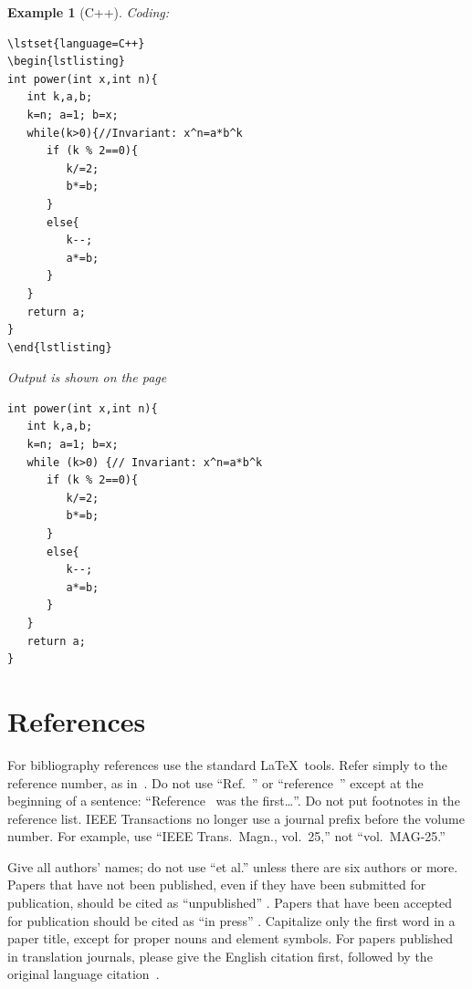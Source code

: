 \documentclass[conference]{IEEEtran}
\newtheorem{example}[remark]{Example}
\begin{document}
\begin{example}[C++]
Coding:
\begin{verbatim}
\lstset{language=C++}
\begin{lstlisting}
int power(int x,int n){
   int k,a,b;
   k=n; a=1; b=x;
   while(k>0){//Invariant: x^n=a*b^k
      if (k % 2==0){
         k/=2;
         b*=b;
      }
      else{
         k--;
         a*=b;
      }
   }
   return a;
}
\end{lstlisting}
\end{verbatim}
Output is shown on the page~\pageref{c++}
\begin{algorithm}[tbp]
\caption{Calculating $x$ to the 
power~$n$ in C++\label{c++}}
\lstset{language=C++}
\begin{lstlisting}
int power(int x,int n){
   int k,a,b;
   k=n; a=1; b=x;
   while (k>0) {// Invariant: x^n=a*b^k
      if (k % 2==0){
         k/=2;
         b*=b;
      }
      else{
         k--;
         a*=b;
      }
   }
   return a;
}
\end{lstlisting}
\end{algorithm}
\end{example}



\section{References}
For bibliography references use the standard \LaTeX\ tools. Refer simply to the reference number, as in~\cite{c3}. Do not use ``Ref.~\cite{c3}'' or ``reference~\cite{c3}'' except at the beginning of a sentence:  ``Reference~\cite{c3} was the first\dots''. Do not put footnotes in the reference list. IEEE Transactions no longer use a journal prefix before the volume number.  For example, use ``IEEE Trans.\ Magn., vol.~25,'' not ``vol.~MAG-25.''

Give all authors' names; do not use ``et al.'' unless there are six authors or more.  Papers that have not been published, even if they have been submitted for publication, should be cited as ``unpublished'' \cite{cu}.  Papers that have been accepted for publication should be cited as ``in press'' \cite{cin}.  Capitalize only the first word in a paper title, except for proper nouns and element symbols.
For papers published in translation journals, please give the English citation first, followed by the original language citation~\cite{ctr}.

\balance
\end{document}

